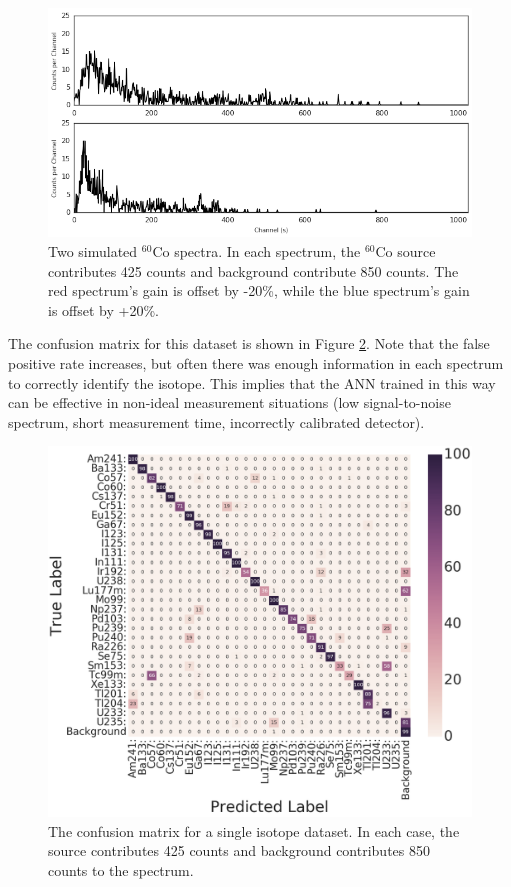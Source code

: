 \documentclass[tocnosub,noragright,centerchapter,12pt,fullpage]{uiucecethesis09}
\begin{document}
\begin{figure}[H]
\centering
\includegraphics[width=0.75\linewidth]{images/Co60_both_10s}
\caption{Two simulated $^{60}$Co spectra. In each spectrum, the $^{60}$Co source contributes 425 counts and background contribute 850 counts. The red spectrum's gain is offset by -20\%, while the blue spectrum's gain is offset by +20\%.}
\label{fig:co60_diff_pmt_10s}
\end{figure}

The confusion matrix for this dataset is shown in Figure \ref{fig:conf_matrix_10s}. Note that the false positive rate increases, but often there was enough information in each spectrum to correctly identify the isotope. This implies that the ANN trained in this way can be effective in non-ideal measurement situations (low signal-to-noise spectrum, short measurement time, incorrectly calibrated detector).

\begin{figure}[H]
\centering
\includegraphics[width=0.9\linewidth]{images/conf_matrix_10s}
\caption{The confusion matrix for a single isotope dataset. In each case, the source contributes 425 counts and background contributes 850 counts to the spectrum.}
\label{fig:conf_matrix_10s}
\end{figure}
\end{document}
